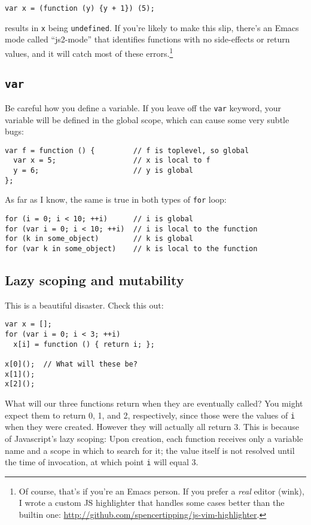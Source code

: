 \documentclass{article}
\begin{document}
\begin{verbatim}
var x = (function (y) {y + 1}) (5);
\end{verbatim}

    \noindent results in \verb|x| being \verb|undefined|. If you're likely to make this slip, there's an Emacs mode called ``js2-mode'' that identifies functions with no side-effects or return
    values, and it will catch most of these errors.\footnote{Of course, that's if you're an Emacs person. If you prefer a {\it real} editor (wink), I wrote a custom JS highlighter that handles
    some cases better than the builtin one: \url{http://github.com/spencertipping/js-vim-highlighter}.}

\subsection {{\tt var}}
    Be careful how you define a variable. If you leave off the {\tt var} keyword, your variable will be defined in the global scope, which can cause some very subtle bugs:

\begin{verbatim}
var f = function () {         // f is toplevel, so global
  var x = 5;                  // x is local to f
  y = 6;                      // y is global
};
\end{verbatim}

    As far as I know, the same is true in both types of \verb|for| loop:

\begin{verbatim}
for (i = 0; i < 10; ++i)      // i is global
for (var i = 0; i < 10; ++i)  // i is local to the function
for (k in some_object)        // k is global
for (var k in some_object)    // k is local to the function
\end{verbatim}

\subsection {Lazy scoping and mutability}
    This is a beautiful disaster. Check this out:

\begin{verbatim}
var x = [];
for (var i = 0; i < 3; ++i)
  x[i] = function () { return i; };

x[0]();  // What will these be?
x[1]();
x[2]();
\end{verbatim}

    What will our three functions return when they are eventually called? You might expect them to return 0, 1, and 2, respectively, since those were the values of \verb|i| when they were
    created. However they will actually all return 3. This is because of Javascript's lazy scoping: Upon creation, each function receives only a variable name and a scope in which to search
    for it; the value itself is not resolved until the time of invocation, at which point \verb|i| will equal 3.
\end{document}
